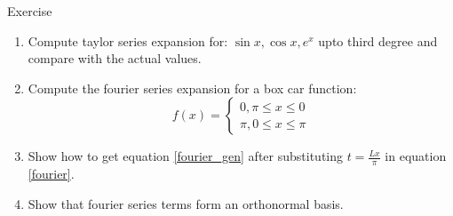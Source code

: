 \documentclass[11pt,titlepage,fleqn]{article}
\begin{document}
\begin{section}{Exercise}
\begin{enumerate}
\item Compute taylor series expansion for: $\sin x, \cos x, e^x$ upto third degree and compare with the actual values.

\item Compute the fourier series expansion for a box car function:
\begin{equation}
f(x) = \begin{cases}
0, \pi \leq x \leq 0\\
\pi , 0 \leq x \leq \pi
\end{cases}
\end{equation}

\item Show how to get equation \ref{fourier_gen} after substituting $t = \frac{Lx}{\pi}$ in equation \ref{fourier}.

\item Show that fourier series terms form an orthonormal basis.

\end{enumerate}

\end{section}
\end{document}

